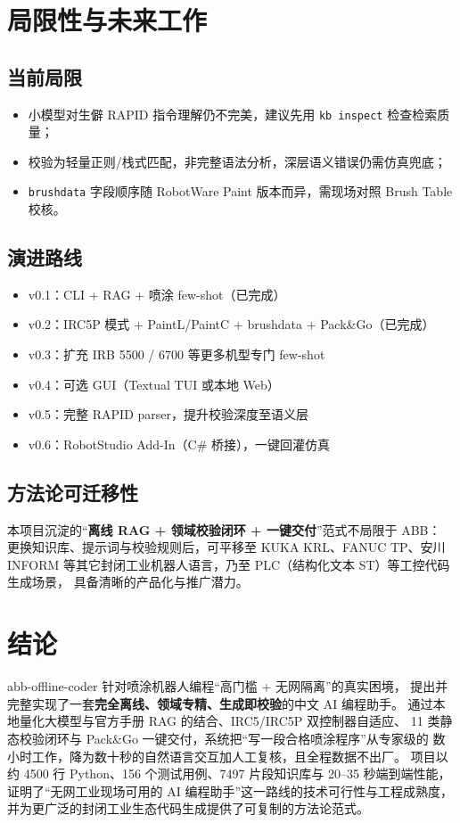 \documentclass[12pt,a4paper,fontset=none]{ctexart}
\begin{document}
\section{局限性与未来工作}
\subsection{当前局限}
\begin{itemize}
  \item 小模型对生僻 RAPID 指令理解仍不完美，建议先用 \texttt{kb inspect} 检查检索质量；
  \item 校验为轻量正则/栈式匹配，非完整语法分析，深层语义错误仍需仿真兜底；
  \item \texttt{brushdata} 字段顺序随 RobotWare Paint 版本而异，需现场对照 Brush Table 校核。
\end{itemize}

\subsection{演进路线}
\begin{itemize}
  \item[\ding{51}] v0.1：CLI + RAG + 喷涂 few-shot（已完成）
  \item[\ding{51}] v0.2：IRC5P 模式 + PaintL/PaintC + brushdata + Pack\&Go（已完成）
  \item[$\square$] v0.3：扩充 IRB 5500 / 6700 等更多机型专门 few-shot
  \item[$\square$] v0.4：可选 GUI（Textual TUI 或本地 Web）
  \item[$\square$] v0.5：完整 RAPID parser，提升校验深度至语义层
  \item[$\square$] v0.6：RobotStudio Add-In（C\# 桥接），一键回灌仿真
\end{itemize}

\subsection{方法论可迁移性}
本项目沉淀的“\textbf{离线 RAG + 领域校验闭环 + 一键交付}”范式不局限于 ABB：
更换知识库、提示词与校验规则后，可平移至 KUKA KRL、FANUC TP、安川 INFORM
等其它封闭工业机器人语言，乃至 PLC（结构化文本 ST）等工控代码生成场景，
具备清晰的产品化与推广潜力。

\section{结论}
abb-offline-coder 针对喷涂机器人编程“高门槛 + 无网隔离”的真实困境，
提出并完整实现了一套\textbf{完全离线、领域专精、生成即校验}的中文 AI 编程助手。
通过本地量化大模型与官方手册 RAG 的结合、IRC5/IRC5P 双控制器自适应、
11 类静态校验闭环与 Pack\&Go 一键交付，系统把“写一段合格喷涂程序”从专家级的
数小时工作，降为数十秒的自然语言交互加人工复核，且全程数据不出厂。
项目以约 4500 行 Python、156 个测试用例、7497 片段知识库与 20--35 秒端到端性能，
证明了“无网工业现场可用的 AI 编程助手”这一路线的技术可行性与工程成熟度，
并为更广泛的封闭工业生态代码生成提供了可复制的方法论范式。
\end{document}
